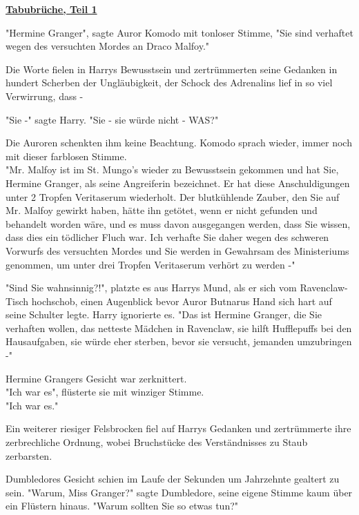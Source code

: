 

\hypertarget{tabubruxfcche-teil-1}{%

\textbf{\uline{Tabubrüche, Teil 1}}

"Hermine Granger", sagte Auror Komodo mit tonloser Stimme, "Sie sind verhaftet wegen des versuchten Mordes an Draco Malfoy."

Die Worte fielen in Harrys Bewusstsein und zertrümmerten seine Gedanken in hundert Scherben der Ungläubigkeit, der Schock des Adrenalins lief in so viel Verwirrung, dass -

"Sie -" sagte Harry. "Sie - sie würde nicht - WAS?"

Die Auroren schenkten ihm keine Beachtung. Komodo sprach wieder, immer noch mit dieser farblosen Stimme.\\ "Mr. Malfoy ist im St. Mungo's wieder zu Bewusstsein gekommen und hat Sie, Hermine Granger, als seine Angreiferin bezeichnet. Er hat diese Anschuldigungen unter 2 Tropfen Veritaserum wiederholt. Der blutkühlende Zauber, den Sie auf Mr. Malfoy gewirkt haben, hätte ihn getötet, wenn er nicht gefunden und behandelt worden wäre, und es muss davon ausgegangen werden, dass Sie wissen, dass dies ein tödlicher Fluch war. Ich verhafte Sie daher wegen des schweren Vorwurfs des versuchten Mordes und Sie werden in Gewahrsam des Ministeriums genommen, um unter drei Tropfen Veritaserum verhört zu werden -"

"Sind Sie wahnsinnig?!", platzte es aus Harrys Mund, als er sich vom Ravenclaw-Tisch hochschob, einen Augenblick bevor Auror Butnarus Hand sich hart auf seine Schulter legte. Harry ignorierte es. "Das ist Hermine Granger, die Sie verhaften wollen, das netteste Mädchen in Ravenclaw, sie hilft Hufflepuffs bei den Hausaufgaben, sie würde eher sterben, bevor sie versucht, jemanden umzubringen -"

Hermine Grangers Gesicht war zerknittert.\\ "Ich war es", flüsterte sie mit winziger Stimme.\\ "Ich war es."

Ein weiterer riesiger Felsbrocken fiel auf Harrys Gedanken und zertrümmerte ihre zerbrechliche Ordnung, wobei Bruchstücke des Verständnisses zu Staub zerbarsten.

Dumbledores Gesicht schien im Laufe der Sekunden um Jahrzehnte gealtert zu sein. "Warum, Miss Granger?" sagte Dumbledore, seine eigene Stimme kaum über ein Flüstern hinaus. "Warum sollten Sie so etwas tun?"

}
